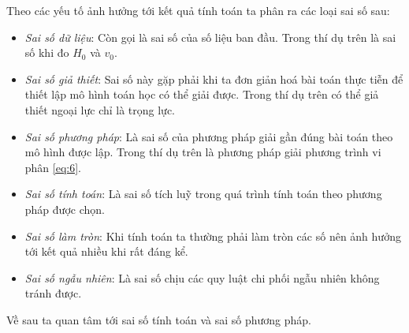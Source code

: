 \documentclass{article}    %
\begin{document}
Theo các yếu tố ảnh hưởng tới kết quả tính toán ta phân ra các loại sai số sau:
\begin{itemize}
    \item \emph{Sai số dữ liệu}: Còn gọi là sai số của số liệu ban đầu. Trong
        thí dụ trên là sai số khi đo \(H_0\) và \(v_0\).
    \item \emph{Sai số giả thiết}: Sai số này gặp phải khi ta đơn giản hoá bài
        toán thực tiễn để thiết lập mô hình toán học có thể giải được. Trong thí
        dụ trên có thể giả thiết ngoại lực chỉ là trọng lực.
    \item \emph{Sai số phương pháp}: Là sai số của phương pháp giải gần đúng bài
        toán theo mô hình được lập. Trong thí dụ trên là phương pháp giải phương
        trình vi phân \ref{eq:6}.
    \item \emph{Sai số tính toán}: Là sai số tích luỹ trong quá trình tính toán
        theo phương pháp được chọn.
    \item \emph{Sai số làm tròn}: Khi tính toán ta thường phải làm tròn các số
        nên ảnh hưởng tới kết quả nhiều khi rất đáng kể.
    \item \emph{Sai số ngẫu nhiên}: Là sai số chịu các quy luật chi phối ngẫu
        nhiên không tránh được.
\end{itemize}

Về sau ta  quan tâm tới sai số tính toán và sai số phương pháp.
\end{document}
